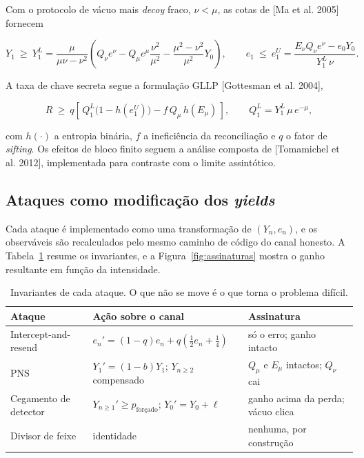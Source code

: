 \documentclass[12pt]{article}
\begin{document}
Com o protocolo de vácuo mais \emph{decoy} fraco, $\nu < \mu$, as cotas de
[Ma et al. 2005] fornecem

\begin{equation}
Y_1 \ \ge\ Y_1^{L} = \frac{\mu}{\mu\nu - \nu^2}
\left( Q_\nu e^{\nu} - Q_\mu e^{\mu}\frac{\nu^2}{\mu^2}
- \frac{\mu^2-\nu^2}{\mu^2} Y_0 \right),
\qquad
e_1 \ \le\ e_1^{U} = \frac{E_\nu Q_\nu e^{\nu} - e_0 Y_0}{Y_1^{L}\,\nu} .
\end{equation}

A taxa de chave secreta segue a formulação GLLP [Gottesman et al. 2004],

\begin{equation}
R \ \ge\ q \left[\, Q_1^{L}\bigl(1 - h(e_1^{U})\bigr) - f\,Q_\mu\,h(E_\mu) \,\right],
\qquad Q_1^{L} = Y_1^{L}\,\mu\,e^{-\mu},
\end{equation}

com $h(\cdot)$ a entropia binária, $f$ a ineficiência da reconciliação e $q$ o
fator de \emph{sifting}. Os efeitos de bloco finito seguem a análise composta de
[Tomamichel et al. 2012], implementada para contraste com o limite assintótico.

\subsection{Ataques como modificação dos \emph{yields}}

Cada ataque é implementado como uma transformação de $(Y_n, e_n)$, e os
observáveis são recalculados pelo mesmo caminho de código do canal honesto. A
Tabela~\ref{tab:ataques} resume os invariantes, e a Figura~\ref{fig:assinaturas}
mostra o ganho resultante em função da intensidade.

\begin{table}[htbp]
\centering
\caption{Invariantes de cada ataque. O que não se move é o que torna o problema
difícil.}
\label{tab:ataques}
\small
\begin{tabular}{@{}lll@{}}
\toprule
\textbf{Ataque} & \textbf{Ação sobre o canal} & \textbf{Assinatura} \\
\midrule
Intercept-and-resend & $e_n' = (1-q)e_n + q(\tfrac12 e_n + \tfrac14)$ & só o erro; ganho intacto \\
PNS & $Y_1' = (1-b)Y_1$; $Y_{n\ge2}$ compensado & $Q_\mu$ e $E_\mu$ intactos; $Q_\nu$ cai \\
Cegamento de detector & $Y_{n\ge1}' \ge p_{\text{forçado}}$; $Y_0' = Y_0 + \ell$ & ganho acima da perda; vácuo clica \\
Divisor de feixe & identidade & nenhuma, por construção \\
\bottomrule
\end{tabular}
\end{table}
\end{document}
